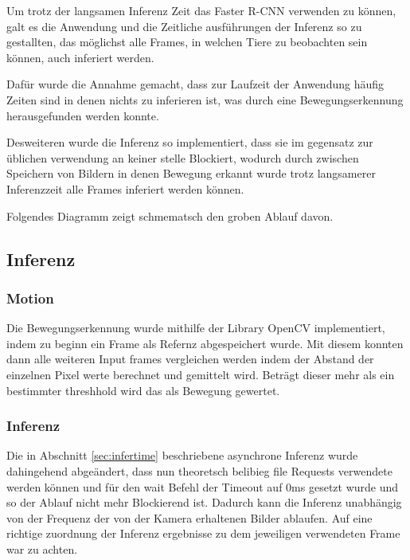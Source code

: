 Um trotz der langsamen Inferenz Zeit das Faster R-CNN 
verwenden zu können, galt es die Anwendung und die 
Zeitliche ausführungen der Inferenz so zu gestallten, 
das möglichst alle Frames, in welchen Tiere zu beobachten 
sein können, auch inferiert werden.

Dafür wurde die Annahme gemacht, dass zur Laufzeit der 
Anwendung häufig Zeiten sind in denen nichts zu inferieren 
ist, was durch eine Bewegungserkennung herausgefunden werden 
konnte.

Desweiteren wurde die Inferenz so implementiert, dass sie 
im gegensatz zur üblichen verwendung an keiner stelle Blockiert, 
wodurch durch zwischen Speichern von Bildern in denen 
Bewegung erkannt wurde trotz langsamerer Inferenzzeit alle 
Frames inferiert werden können.

Folgendes Diagramm zeigt schmematsch den groben Ablauf davon.

\vspace{1cm}


\begin{center}

\end{center}

\subsection{Inferenz}

\subsubsection{Motion}

Die Bewegungserkennung wurde mithilfe der Library OpenCV implementiert, indem
zu beginn ein Frame als Refernz abgespeichert wurde.
Mit diesem konnten dann alle weiteren Input frames vergleichen werden 
indem der Abstand der einzelnen Pixel werte berechnet und gemittelt wird.
Beträgt dieser mehr als ein bestimmter threshhold wird das als Bewegung 
gewertet.

\subsubsection{Inferenz}

Die in Abschnitt \ref{sec:infertime} beschriebene asynchrone 
Inferenz wurde dahingehend abgeändert, dass nun theoretsch belibieg file 
Requests verwendete werden können und für den wait Befehl der 
Timeout auf 0ms gesetzt wurde und so der Ablauf nicht mehr Blockierend 
ist. Dadurch kann die Inferenz unabhängig von der Frequenz der 
von der Kamera erhaltenen Bilder ablaufen.
Auf eine richtige zuordnung der Inferenz ergebnisse zu dem 
jeweiligen verwendeten Frame war zu achten.


